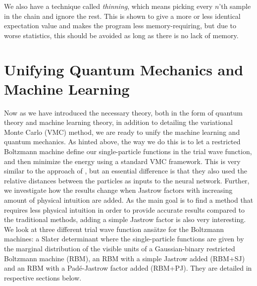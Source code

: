 We also have a technique called \textit{thinning}, which means picking every $n$'th sample in the chain and ignore the rest. This is shown to give a more or less identical expectation value and makes the program less memory-requiring, but due to worse statistics, this should be avoided as long as there is no lack of memory. 

\section{Unifying Quantum Mechanics and Machine Learning} \label{sec:unifying}
Now as we have introduced the necessary theory, both in the form of quantum theory and machine learning theory, in addition to detailing the variational Monte Carlo (VMC) method, we are ready to unify the machine learning and quantum mechanics. As hinted above, the way we do this is to let a restricted Boltzmann machine define our single-particle functions in the trial wave function, and then minimize the energy using a standard VMC framework. This is very similar to the approach of \citet{pfau2019abinitio}, but an essential difference is that they also used the relative distances between the particles as inputs to the neural network. Further, we investigate how the results change when Jastrow factors with increasing amount of physical intuition are added. As the main goal is to find a method that requires less physical intuition in order to provide accurate results compared to the traditional methods, adding a simple Jastrow factor is also very interesting. We look at three different trial wave function ansätze for the Boltzmann machines: a Slater determinant where the single-particle functions are given by the marginal distribution of the visible units of a Gaussian-binary restricted Boltzmann machine (RBM), an RBM with a simple Jastrow added (RBM+SJ) and an RBM with a Padé-Jastrow factor added (RBM+PJ). They are detailed in respective sections below.

